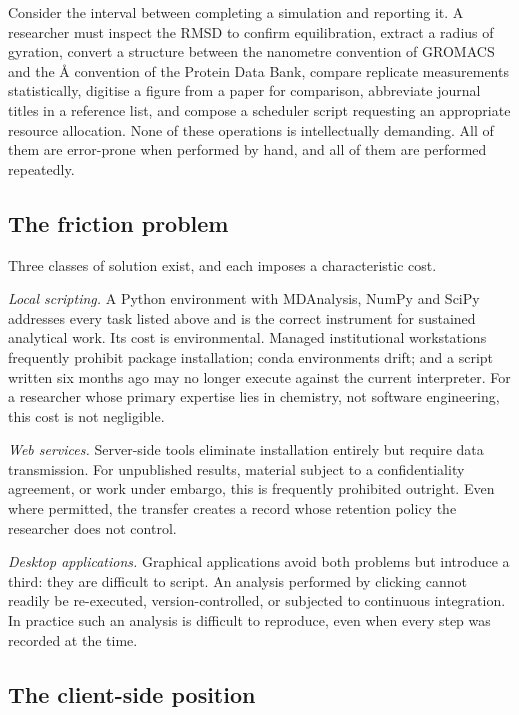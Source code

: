 \documentclass[11pt,a4paper]{article}
\begin{document}
Consider the interval between completing a simulation and reporting it. A
researcher must inspect the RMSD to confirm equilibration, extract a radius of
gyration, convert a structure between the nanometre convention of GROMACS and
the \si{\angstrom} convention of the Protein Data Bank, compare replicate
measurements statistically, digitise a figure from a paper for comparison,
abbreviate journal titles in a reference list, and compose a scheduler script
requesting an appropriate resource allocation. None of these operations is
intellectually demanding. All of them are error-prone when performed by hand,
and all of them are performed repeatedly.

\subsection{The friction problem}\label{sec:friction}

Three classes of solution exist, and each imposes a characteristic cost.

\emph{Local scripting.} A Python environment with MDAnalysis, NumPy and SciPy
addresses every task listed above and is the correct instrument for sustained
analytical work. Its cost is environmental. Managed institutional workstations
frequently prohibit package installation; conda environments drift; and a
script written six months ago may no longer execute against the current
interpreter. For a researcher whose primary expertise lies in chemistry, not software engineering, this cost is not negligible.

\emph{Web services.} Server-side tools eliminate installation entirely but
require data transmission. For unpublished results, material subject to a
confidentiality agreement, or work under embargo, this is frequently prohibited
outright. Even where permitted, the transfer creates a record whose retention
policy the researcher does not control.

\emph{Desktop applications.} Graphical applications avoid both problems but
introduce a third: they are difficult to script. An analysis performed by
clicking cannot readily be re-executed, version-controlled, or subjected to
continuous integration. In practice such an analysis is difficult to reproduce,
even when every step was recorded at the time.

\subsection{The client-side position}\label{sec:clientside}
\end{document}
